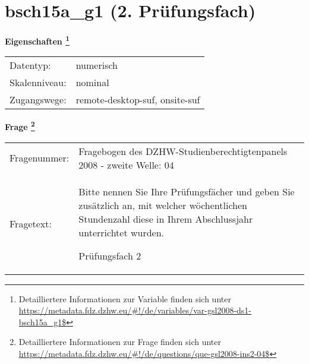 
    \setcounter{footnote}{0}

    \vspace*{-1.8cm}
	\section{bsch15a\_g1 (2. Prüfungsfach)}
	\label{section:bsch15a_g1}



    \vspace*{0.5cm}
    \noindent\textbf{Eigenschaften
	\footnote{Detailliertere Informationen zur Variable finden sich unter
		\url{https://metadata.fdz.dzhw.eu/\#!/de/variables/var-gsl2008-ds1-bsch15a_g1$}}}\\
	\begin{tabularx}{\hsize}{@{}lX}
	Datentyp: & numerisch \\
	Skalenniveau: & nominal \\
	Zugangswege: &
	  remote-desktop-suf, 
	  onsite-suf
 \\
    \end{tabularx}



				\vspace*{0.5cm}
                \noindent\textbf{Frage
	                \footnote{Detailliertere Informationen zur Frage finden sich unter
		              \url{https://metadata.fdz.dzhw.eu/\#!/de/questions/que-gsl2008-ins2-04$}}}\\
				\begin{tabularx}{\hsize}{@{}lX}
					Fragenummer: &
					  Fragebogen des DZHW-Studienberechtigtenpanels 2008 - zweite Welle:
					  04
 \\
					Fragetext: & Bitte nennen Sie Ihre Prüfungsfächer und geben Sie zusätzlich an, mit welcher wöchentlichen Stundenzahl diese in Ihrem Abschlussjahr unterrichtet wurden.\par  Prüfungsfach 2 \\
				\end{tabularx}





